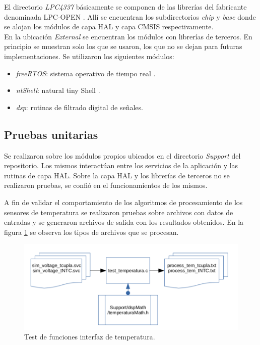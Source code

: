 El directorio \textit{LPC4337} básicamente se componen de las librerías del fabricante denominada LPC-OPEN \citep{lpcopen}. Allí se encuentran los subdirectorios \textit{chip} y \textit{base} donde se alojan los módulos de capa HAL \footnotemark y capa CMSIS \footnotemark respectivamente.\\
En la ubicación \textit{External} se encuentran los módulos con librerías de terceros. En principio se muestran solo los que se usaron, los que no se dejan para futuras implementaciones. Se utilizaron los siguientes módulos:
\begin{itemize}
\item \textit{freeRTOS}: sistema operativo de tiempo real \citep{free_rtos}.
\item \textit{ntShell}: natural tiny Shell \citep{nt_shell}.
\item \textit{dsp}: rutinas de filtrado digital de señales.
\end{itemize}


\subsection{ Pruebas unitarias }

Se realizaron sobre los módulos propios ubicados en el directorio \textit{Support} del repositorio. Los mismos interactúan entre los servicios de la aplicación y las rutinas de capa HAL. Sobre la capa HAL y los librerías de terceros no se realizaron pruebas, se confió en el funcionamientos de los mismos.

A fin de validar el comportamiento de los algoritmos de procesamiento de los sensores de temperatura se realizaron pruebas sobre archivos con datos de entradas y se generaron archivos de salida con los resultados obtenidos. En la figura \ref{fig:diag_test_temp} se observa los tipos de archivos que se procesan.
\begin{figure}[h!]
	\centering
	\includegraphics[width=1.0\textwidth]{Figures/Cap_4/diag_test_temperatura}
	\caption{Test de funciones interfaz de temperatura.}
	\label{fig:diag_test_temp}
\end{figure}

